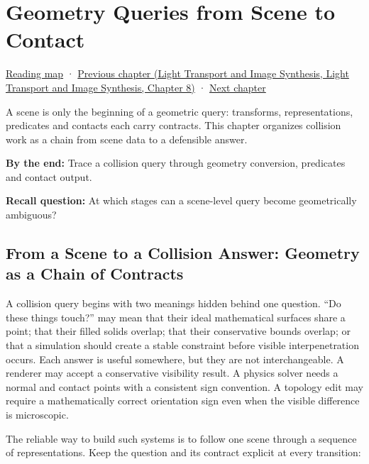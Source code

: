 \hypertarget{03-visual-computing-i-ch020}{}
\chapter{Geometry Queries from Scene to Contact}\label{stagechapter:03-visual-computing-i-ch020}\label{03-visual-computing-i-ch020-geometry-queries-from-scene-to-contact}

\hyperref[volume-reading-map]{Reading map} · \href{../04-Light-Transport-and-Image-Synthesis/main.pdf\#nameddest=03-visual-computing-i-ch019-textures-as-sampled-surface-signals}{Previous chapter (Light Transport and Image Synthesis, Light Transport and Image Synthesis, Chapter 8)} · \hyperref[03-visual-computing-i-ch021-collision-implementations-and-repository-comparison]{Next chapter}

A scene is only the beginning of a geometric query: transforms, representations, predicates and contacts each carry contracts. This chapter organizes collision work as a chain from scene data to a defensible answer.

\textbf{By the end:} Trace a collision query through geometry conversion, predicates and contact output.

\textbf{Recall question:} At which stages can a scene-level query become geometrically ambiguous?

\section{From a Scene to a Collision Answer: Geometry as a Chain of Contracts}\label{03-visual-computing-i-ch020-from-a-scene-to-a-collision-answer-geometry-as-a-chain-of-contracts}

A collision query begins with two meanings hidden behind one question. ``Do these things touch?'' may mean that their ideal mathematical surfaces share a point; that their filled solids overlap; that their conservative bounds overlap; or that a simulation should create a stable constraint before visible interpenetration occurs. Each answer is useful somewhere, but they are not interchangeable. A renderer may accept a conservative visibility result. A physics solver needs a normal and contact points with a consistent sign convention. A topology edit may require a mathematically correct orientation sign even when the visible difference is microscopic.

The reliable way to build such systems is to follow one scene through a sequence of representations. Keep the question and its contract explicit at every transition:

